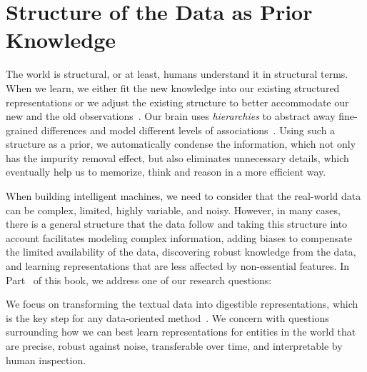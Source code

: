\part{Structure of the Data as Prior Knowledge}
\label{part1}
%

The world is structural, or at least, humans understand it in structural terms. When we learn, we either fit the new knowledge into our existing structured representations or we adjust the existing structure to better accommodate our new and the old observations~\citep{battaglia2018relational}.
%
Our brain uses \emph{hierarchies} to abstract away fine-grained differences and model different levels of associations~\citep{Ballard:2015}. Using such a structure as a prior, we automatically condense the information, which not only has the impurity removal effect, but also eliminates unnecessary details, which eventually help us to memorize, think and reason in a more efficient way.

When building intelligent machines, we need to consider that the real-world data can be complex, limited, highly variable, and noisy. However, in many cases, there is a general structure that the data follow and taking this structure into account facilitates modeling complex information, adding biases to compensate the limited availability of the data, discovering robust knowledge from the data, and learning representations that are less affected by non-essential features. 
%
In Part~\ref{part1} of this book, we address one of our research questions:
\begin{resqbox}
\emph{}
\end{resqbox}
We focus on transforming the textual data into digestible representations, which is the key step for any data-oriented method~\citep{Bengio:2013}. We concern with questions surrounding how we can best learn representations for entities in the world that are precise, robust against noise, transferable over time, and interpretable by human inspection.  

